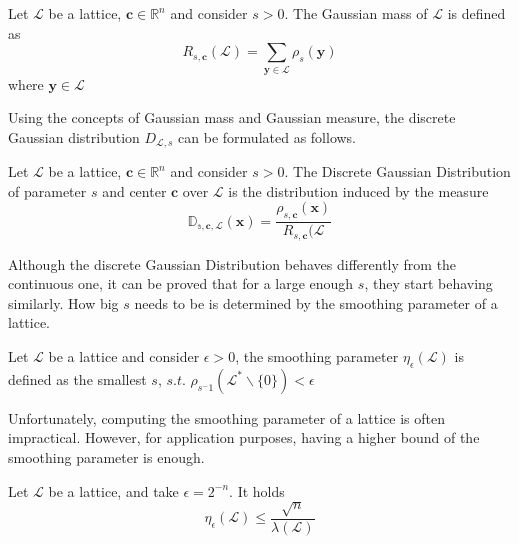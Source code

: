 \begin{definition}
Let $\mathscr{L}$ be a lattice, $\mathbf{c}\in\mathbb{R}^n$ and consider $s>0$. The Gaussian mass of $\mathscr{L}$ is defined as
\begin{equation*}
R_{s,\mathbf{c}}(\mathscr{L})=\sum_{\mathbf{y}\in\mathscr{L}}\rho_s(\mathbf{y})
\end{equation*}
where $\mathbf{y}\in\mathscr{L}$
\end{definition}

Using the concepts of Gaussian mass and Gaussian measure, the discrete Gaussian distribution $D_{\mathscr{L},s}$ can be formulated as follows.

\begin{definition}
Let $\mathscr{L}$ be a lattice, $\mathbf{c}\in\mathbb{R}^n$ and consider $s>0$. The Discrete Gaussian Distribution of parameter $s$ and center $\mathbf{c}$ over $\mathscr{L}$ is the distribution induced by the measure
\begin{equation*}
\mathbb{D_{s,\mathbf{c},\mathscr{L}}}(\mathbf{x})= \frac{\rho_{s,\mathbf{c}}(\mathbf{x})}{R_{s,\mathbf{c}}(\mathscr{L}}
\end{equation*}
\end{definition}

\begin{remark}
Although the discrete Gaussian Distribution behaves differently from the continuous one, it can be proved that for a large enough $s$, they start behaving similarly. How big $s$ needs to be is determined by the smoothing parameter of a lattice.
\end{remark}

\begin{definition}
Let $\mathscr{L}$ be a lattice and consider $\epsilon>0$, the smoothing parameter $\eta_\epsilon(\mathscr{L})$ is defined as the smallest $s$, $s.t.$ $\rho_{s^-1}(\mathscr{L}^*\backslash\{0\})<\epsilon$
\end{definition}

Unfortunately, computing the smoothing parameter of a lattice is often impractical. However, for application purposes, having a higher bound of the smoothing parameter is enough.

\begin{theorem}
Let $\mathscr{L}$ be a lattice, and take $\epsilon=2^{-n}$. It holds
\begin{equation*}
\eta_\epsilon(\mathscr{L})\leq\frac{\sqrt{n}}{\lambda\left(\mathscr{L}\right)}
\end{equation*}
\end{theorem}

